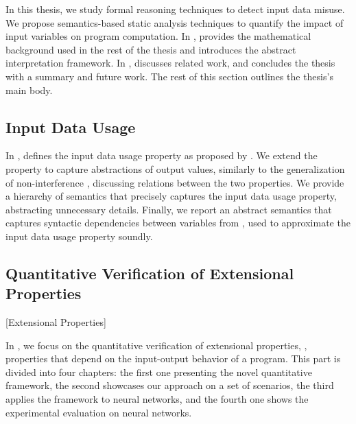 In this thesis, we study formal reasoning techniques to detect input data misuse.
We propose semantics-based static analysis techniques to quantify the impact of input variables on program computation.
In ,
 provides the mathematical background used in the rest of the thesis and introduces the abstract interpretation framework.
In ,  discusses related work, and  concludes the thesis with a summary and future work.
The rest of this section outlines the thesis's main body.

\subsection{Input Data Usage}

In ,  defines the input data usage property as proposed by .
We extend the property to capture abstractions of output values, similarly to the generalization of non-interference , discussing relations between the two properties.
We provide a hierarchy of semantics that precisely captures the input data usage property, abstracting unnecessary details.
Finally, we report an abstract semantics that captures syntactic dependencies between variables from , used to approximate the input data usage property soundly.

\subsection{Quantitative Verification of Extensional Properties}[Extensional Properties]

In , we focus on the quantitative verification of extensional properties, \ie, properties that depend on the input-output behavior of a program.
This part is divided into four chapters: the first one presenting the novel quantitative framework, the second showcases our approach on a set of scenarios, the third applies the framework to neural networks, and the fourth one shows the experimental evaluation on neural networks.

